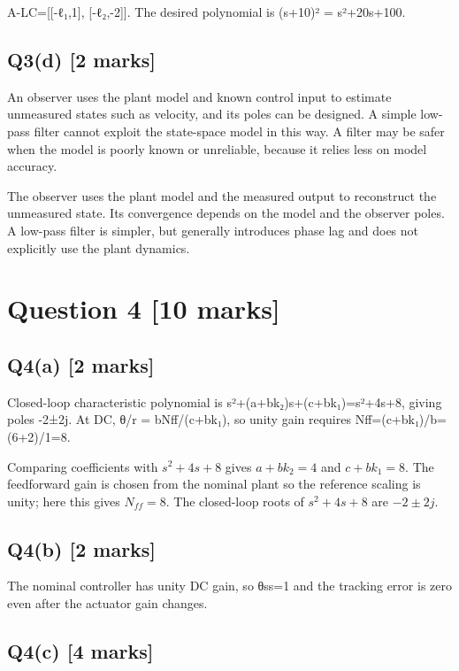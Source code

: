 \documentclass[11pt,a4paper]{article}
\begin{document}
A-LC=[[-ℓ₁,1], [-ℓ₂,-2]].
The desired polynomial is (s+10)² = s²+20s+100.

\subsection*{Q3(d) \hfill [2 marks]}

An observer uses the plant model and known control input to estimate unmeasured states such as velocity, and its poles can be designed.
A simple low-pass filter cannot exploit the state-space model in this way.
A filter may be safer when the model is poorly known or unreliable, because it relies less on model accuracy.\par\smallskip The observer uses the plant model and the measured output to reconstruct the unmeasured state. Its convergence depends on the model and the observer poles. A low-pass filter is simpler, but generally introduces phase lag and does not explicitly use the plant dynamics.

\section*{Question 4 \hfill [10 marks]}
\subsection*{Q4(a) \hfill [2 marks]}

Closed-loop characteristic polynomial is s²+(a+bk₂)s+(c+bk₁)=s²+4s+8, giving poles -2±2j.
At DC, θ/r = bNff/(c+bk₁), so unity gain requires Nff=(c+bk₁)/b=(6+2)/1=8.\par\smallskip Comparing coefficients with $s^2+4s+8$ gives $a+bk_2=4$ and $c+bk_1=8$. The feedforward gain is chosen from the nominal plant so the reference scaling is unity; here this gives $N_{ff}=8$. The closed-loop roots of $s^2+4s+8$ are $-2\pm2j$.

\subsection*{Q4(b) \hfill [2 marks]}

The nominal controller has unity DC gain, so θss=1 and the tracking error is zero even after the actuator gain changes.

\subsection*{Q4(c) \hfill [4 marks]}
\end{document}
